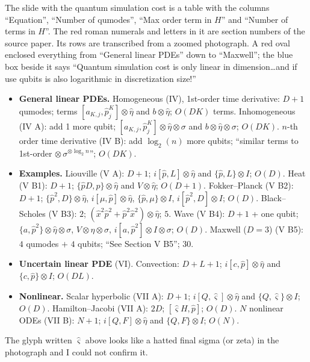 \begin{remark}
\label{remark-liu-pde-table}
The slide with the quantum simulation cost is
a table with the columns ``Equation'',
``Number of qumodes'', ``Max order term in
$H$'' and ``Number of terms in $H$''. The red
roman numerals and letters in it are section
numbers of the source paper. Its rows are
transcribed from a zoomed photograph. A red
oval enclosed everything from ``General
linear PDEs'' down to ``Maxwell''; the blue
box beside it says ``Quantum simulation cost
is only linear in dimension\dots and if use
qubits is also logarithmic in discretization
size!''
\begin{itemize}
\item {\bf General linear PDEs.}
Homogeneous (IV), 1st-order time derivative:
$D+1$ qumodes; terms
$[a_{K,j},\hat p_j^K]\otimes\hat\eta$ and
$b\otimes\hat\eta$; $O(DK)$ terms.
Inhomogeneous (IV A): add 1 more qubit;
$[a_{K,j},\hat p_j^K]\otimes\hat\eta\otimes
\sigma$ and $b\otimes\hat\eta\otimes\sigma$;
$O(DK)$. $n$-th order time derivative (IV B):
add $\log_2(n)$ more qubits; ``similar terms
to 1st-order
$\otimes\,\sigma^{\otimes\log_2n}$'';
$O(DK)$.

\item {\bf Examples.}
Liouville (V A): $D+1$;
$i[\hat p,L]\otimes\hat\eta$ and
$\{\hat p,L\}\otimes I$; $O(D)$.
Heat (V B1): $D+1$;
$\{\hat pD,\hat p\}\otimes\hat\eta$ and
$V\otimes\hat\eta$; $O(D+1)$.
Fokker--Planck (V B2): $D+1$;
$\{\hat p^2,D\}\otimes\hat\eta$,
$i[\mu,\hat p]\otimes\hat\eta$,
$\{\hat p,\mu\}\otimes I$,
$i[\hat p^2,D]\otimes I$; $O(D)$.
Black--Scholes (V B3): $2$;
$(\hat x^2\hat p^2+\hat p^2\hat x^2)\otimes
\hat\eta$; $5$.
Wave (V B4): $D+1$ + one qubit;
$\{a,\hat p^2\}\otimes\hat\eta\otimes\sigma$,
$V\otimes\eta\otimes\sigma$,
$i[a,\hat p^2]\otimes I\otimes\sigma$; $O(D)$.
Maxwell ($D=3$) (V B5): $4$ qumodes $+$ $4$
qubits; ``See Section V B5''; $30$.

\item {\bf Uncertain linear PDE} (VI).
Convection: $D+L+1$;
$i[c,\hat p]\otimes\hat\eta$ and
$\{c,\hat p\}\otimes I$; $O(DL)$.

\item {\bf Nonlinear.}
Scalar hyperbolic (VII A): $D+1$;
$i[Q,\hat\varsigma]\otimes\hat\eta$ and
$\{Q,\hat\varsigma\}\otimes I$; $O(D)$.
Hamilton--Jacobi (VII A): $2D$;
$[\hat\varsigma H,\hat p]$; $O(D)$.
$N$ nonlinear ODEs (VII B): $N+1$;
$i[Q,F]\otimes\hat\eta$ and
$\{Q,F\}\otimes I$; $O(N)$.
\end{itemize}
The glyph written $\hat\varsigma$ above looks
like a hatted final sigma (or zeta) in the
photograph and I could not confirm it.
\end{remark}

